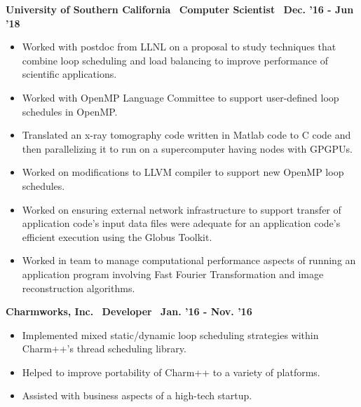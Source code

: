\textbf{University of Southern California$\>$$\>$$\>$$\>$Computer Scientist$\>$$\>$$\>$$\>$Dec. '16 - Jun '18}
\vspace*{-0.0in} 
\begin{itemize}
\item Worked with postdoc from LLNL on a proposal to study
techniques that combine loop scheduling and load balancing to improve
performance of scientific applications.
\item Worked with OpenMP Language Committee to support user-defined loop schedules in OpenMP.
\item Translated an x-ray tomography code written in
Matlab code to C code and then parallelizing it to run on a supercomputer
having nodes with GPGPUs. 
\item Worked on modifications to LLVM compiler to support new
OpenMP loop schedules. 
\item Worked on ensuring external network infrastructure to support transfer of application code's input data files were adequate
for an application code's efficient execution using the Globus Toolkit.
\item Worked in team to manage computational performance aspects of running an application program involving Fast Fourier Transformation and image reconstruction algorithms. 
\end{itemize}

\textbf{Charmworks, Inc.$\>$$\>$$\>$$\>$Developer$\>$$\>$$\>$$\>$Jan. '16 - Nov. '16}
\vspace*{-0.0in}
\begin{itemize}
\item Implemented mixed static/dynamic loop scheduling
strategies within Charm++'s thread scheduling library.
\item Helped to improve portability of Charm++ to a variety of platforms. 
\item Assisted with business aspects of a high-tech startup. 
\end{itemize} 

